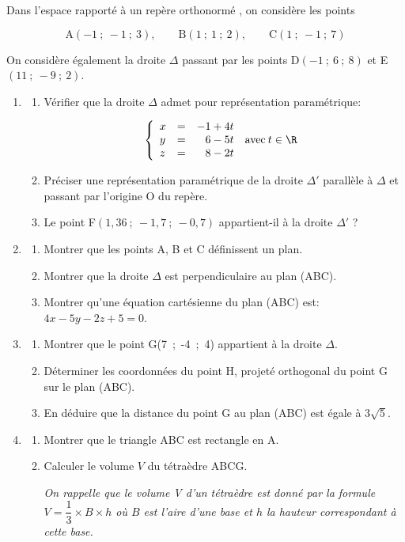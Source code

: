 \medskip

Dans l'espace rapporté à un repère orthonormé \Oijk, on considère les points

\[\text{A}(-1~;~-1~;~3),\qquad \text{B}(1~;~1~;~2),\qquad  \text{C}(1~;~-1~;~7)\]

On considère également la droite $\Delta$ passant par les points D$(-1~;~6~;~8)$ et E$(11~;~- 9~;~2)$.

\medskip

\begin{enumerate}
\item 
	\begin{enumerate}
		\item Vérifier que la droite $\Delta$ admet pour représentation paramétrique: 
		
\[\left\{\begin{array}{l c l}
x &=& -1 + 4t\\
y &=& \phantom{-}6 - 5t \quad\text{avec}\: t \in \R\\
z &=& \phantom{-}8 - 2t
\end{array}\right.\]

		\item Préciser une représentation paramétrique de la droite $\Delta'$ parallèle à $\Delta$ et passant par l'origine O du repère.
		\item Le point F$(1,36~;~-1,7~;~-0,7)$ appartient-il à la droite $\Delta'$ ?
	\end{enumerate}	
\item
	\begin{enumerate}
		\item Montrer que les points A, B et C définissent un plan.
		\item Montrer que la droite $\Delta$ est perpendiculaire au plan (ABC).
		\item Montrer qu'une équation cartésienne du plan (ABC) est: $4x - 5y - 2z + 5 = 0$.
	\end{enumerate}
\item
	\begin{enumerate}
		\item Montrer que le point G(7~;~-4~;~4) appartient à la droite $\Delta$.
		\item Déterminer les coordonnées du point H, projeté orthogonal du point G sur le plan (ABC).
		\item En déduire que la distance du point G au plan (ABC) est égale à $3\sqrt 5$.
	\end{enumerate}
\item
	\begin{enumerate}
		\item Montrer que le triangle ABC est rectangle en A.
		\item Calculer le volume $V$ du tétraèdre ABCG.
		
\emph{On rappelle que le volume V d'un tétraèdre est donné par la formule $V = \dfrac13 \times  B \times h$ où $B$ est l'aire d'une base et $h$ la hauteur correspondant à cette base.}
	\end{enumerate}
\end{enumerate}
